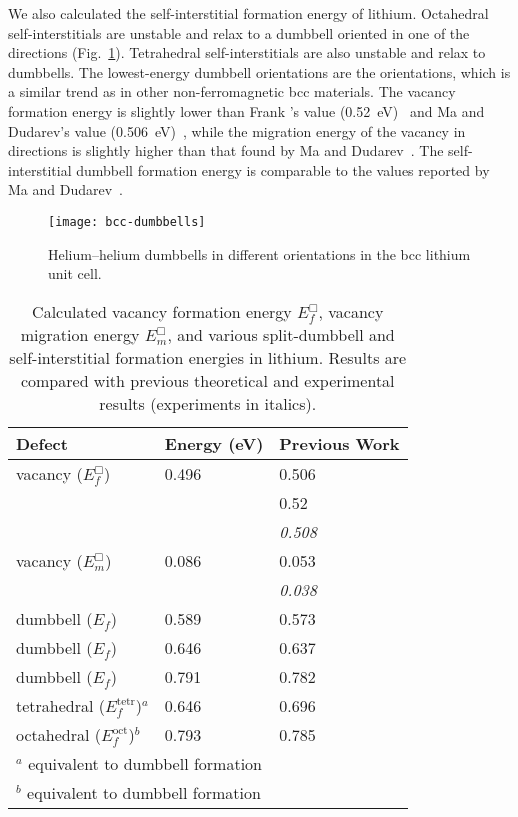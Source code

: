 We also calculated the self-interstitial formation energy of lithium.
Octahedral self-interstitials are unstable and relax to a dumbbell oriented in
one of the  directions (Fig.~\ref{fig:dmbl}). Tetrahedral
self-interstitials are also unstable and relax to  dumbbells. The
lowest-energy dumbbell orientations are the  orientations, which is a
similar trend as in other non-ferromagnetic bcc materials. The vacancy
formation energy is slightly lower than Frank \etal's value
(0.52~eV)~\cite{frank1996first} and Ma and Dudarev's value
(0.506~eV)~\cite{ma2019effect}, while the migration energy of the vacancy in
 directions is slightly higher than that found by Ma and
Dudarev~\cite{ma2019effect}.
The self-interstitial dumbbell formation energy is comparable to the values
reported by Ma and Dudarev~\cite{ma2019}.

\begin{figure}
	\centering
	\texttt{[image: bcc-dumbbells]}
	\caption{Helium--helium dumbbells in different orientations in the bcc
        lithium unit cell.}
	\label{fig:dmbl}
\end{figure}

\begin{table}
\caption[Calculated vacancy formation energy $E_f^{\Box}$, vacancy migration
    energy $E_m^\Box$, and various split-dumbbell and self-interstitial
    formation energies in lithium]{Calculated vacancy formation energy $E_f^{\Box}$, vacancy migration
    energy $E_m^\Box$, and various split-dumbbell and self-interstitial
    formation energies in lithium.
    Results are compared with previous theoretical and experimental results
    (experiments in italics).}
\label{tab:lidmble}
\centering
\renewcommand{\arraystretch}{1.2}
\begin{tabular}{l l l}
  \toprule
  Defect & Energy (eV) & Previous Work \\
  \midrule
  vacancy ($E_f^{\Box}$)
    & 0.496 & 0.506~\cite{ma2019effect} \\
    & & 0.52~\cite{frank1996first} \\
    & & \textit{0.508}~\cite{LandoltBornstein1991} \\
  vacancy ($E_m^\Box$) & 0.086 & 0.053~\cite{ma2019effect} \\ 
    & & \textit{0.038}~\cite{LandoltBornstein1991} \\ 
   dumbbell ($E_f$) & 0.589 & 0.573~\cite{ma2019} \\
   dumbbell ($E_f$) & 0.646 & 0.637~\cite{ma2019} \\
   dumbbell ($E_f$) & 0.791 & 0.782~\cite{ma2019} \\
  tetrahedral ($E_f^{\text{tetr}}$)$^a$ & 0.646 & 0.696~\cite{ma2019} \\
  octahedral ($E_f^{\text{oct}}$)$^b$ & 0.793	& 0.785~\cite{ma2019} \\
  \bottomrule
  \multicolumn{3}{l}{$^a$ equivalent to  dumbbell formation} \\
  \multicolumn{3}{l}{$^b$ equivalent to  dumbbell formation} \\
\end{tabular}
\end{table}


